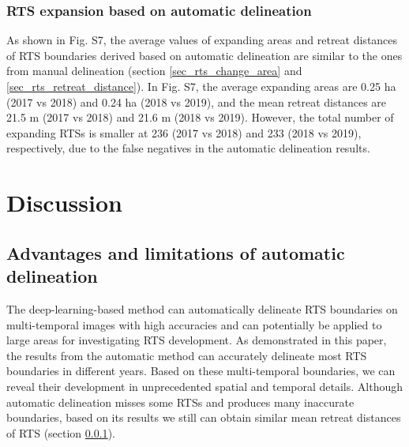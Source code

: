 \documentclass[authoryear,preprint,review,12pt]{elsarticle}
\begin{document}
 


\subsubsection{RTS expansion based on automatic delineation}
\label{sec_rts_change_auto_mapping}

As shown in Fig. S7, the average values of expanding areas and retreat distances of RTS boundaries derived based on automatic delineation are similar to the ones from manual delineation (section \ref{sec_rts_change_area} and \ref{sec_rts_retreat_distance}).
In Fig. S7, the average expanding areas are 0.25 ha (2017 vs 2018) and 0.24 ha (2018 vs 2019), and the mean retreat distances are 21.5 m (2017 vs 2018)  and 21.6 m (2018 vs 2019). 
However, the total number of expanding RTSs is smaller at 236 (2017 vs 2018) and 233 (2018 vs 2019), respectively, due to the false negatives in the automatic delineation results.

 

\section{Discussion}
\label{sec_discussion}

\subsection{Advantages and limitations of automatic delineation}
\label{sec_diss_mapping_rts_multi_images}

The deep-learning-based method can automatically delineate RTS boundaries on multi-temporal images with high accuracies and can potentially be applied to large areas for investigating RTS development. 
As demonstrated in this paper, the results from the automatic method can accurately delineate most RTS boundaries in different years.
Based on these multi-temporal boundaries, we can reveal their development in unprecedented spatial and temporal details. 
Although automatic delineation misses some RTSs and produces many inaccurate boundaries, based on its results we still can obtain similar mean retreat distances of RTS (section \ref{sec_rts_change_auto_mapping}). 
\end{document}

